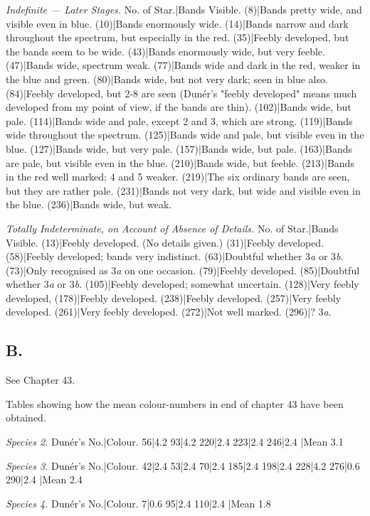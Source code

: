 \documentclass[a4paper, 12pt, oneside, polutonikogreek, english]{article}
\begin{document}
\emph{Indefinite --- Later Stages.} 
No. of Star.|Bands Visible. 
(8)|Bands pretty wide, and visible even in blue. 
(10)|Bands enormously wide. 
(14)|Bands narrow and dark throughout the spectrum, but especially in the red. 
(35)|Feebly developed, but the bands seem to be wide. 
(43)|Bands enormously wide, but very feeble. 
(47)|Bands wide, spectrum weak. 
(77)|Bands wide and dark in the red, weaker in the blue and green. 
(80)|Bands wide, but not very dark; seen in blue also. 
(84)|Feebly developed, but 2-8 are seen (Dunér's "feebly developed" means much developed from my point of view, if the bands are thin). 
(102)|Bands wide, but pale. 
(114)|Bands wide and pale, except 2 and 3, which are strong. 
(119)|Bands wide throughout the spectrum. 
(125)|Bands wide and pale, but visible even in the blue. 
(127)|Bands wide, but very pale. 
(157)|Bands wide, but pale. 
(163)|Bands are pale, but visible even in the blue. 
(210)|Bands wide, but feeble. 
(213)|Bands in the red well marked; 4 and 5 weaker. 
(219)|The six ordinary bands are seen, but they are rather pale. 
(231)|Bands not very dark, but wide and visible even in the blue. 
(236)|Bands wide, but weak. 

\emph{Totally Indeterminate, on Account of Absence of Details.} 
No. of Star.|Bands Visible. 
(13)|Feebly developed. (No details given.) 
(31)|Feebly developed. 
(58)|Feebly developed; bands very indistinct. 
(63)|Doubtful whether 3\emph{a} or 3\emph{b}. 
(73)|Only recognised as 3\emph{a} on one occasion. 
(79)|Feebly developed. 
(85)|Doubtful whether 3\emph{a} or 3\emph{b}. 
(105)|Feebly developed; somewhat uncertain. 
(128)|Very feebly developed, 
(178)|Feebly developed. 
(238)|Feebly developed. 
(257)|Very feebly developed. 
(261)|Very feebly developed. 
(272)|Not well marked. 
(296)|? 3\emph{a}. 

\subsection{B.}

See Chapter 43.

Tables showing how the mean colour-numbers in end of chapter 43 have been obtained.

\emph{Species 2.} 
Dunér's No.|Colour. 
56|4.2 
93|4.2 
220|2.4 
223|2.4 
246|2.4 
|Mean 3.1 

\emph{Species 3.} 
Dunér's No.|Colour. 
42|2.4 
53|2.4 
70|2.4 
185|2.4 
198|2.4 
228|4.2 
276|0.6 
290|2.4 
|Mean 2.4 

\emph{Species 4.} 
Dunér's No.|Colour. 
7|0.6 
95|2.4 
110|2.4 
|Mean 1.8 
\end{document}
